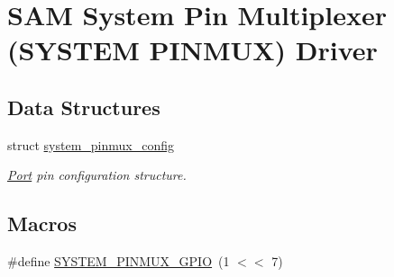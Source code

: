 \hypertarget{group__asfdoc__sam0__system__pinmux__group}{}\section{S\+AM System Pin Multiplexer (S\+Y\+S\+T\+EM P\+I\+N\+M\+UX) Driver}
\label{group__asfdoc__sam0__system__pinmux__group}
\subsection*{Data Structures}
\begin{DoxyCompactItemize}
\item 
struct \mbox{\hyperlink{structsystem__pinmux__config}{system\+\_\+pinmux\+\_\+config}}
\begin{DoxyCompactList}\small\item\em \mbox{\hyperlink{struct_port}{Port}} pin configuration structure. \end{DoxyCompactList}\end{DoxyCompactItemize}
\subsection*{Macros}
\begin{DoxyCompactItemize}
\item 
\#define \mbox{\hyperlink{group__asfdoc__sam0__system__pinmux__group_gaf212e7bc2a29cb57ab7b1130e4404a6b}{S\+Y\+S\+T\+E\+M\+\_\+\+P\+I\+N\+M\+U\+X\+\_\+\+G\+P\+IO}}~(1 $<$$<$ 7)
\end{DoxyCompactItemize}
